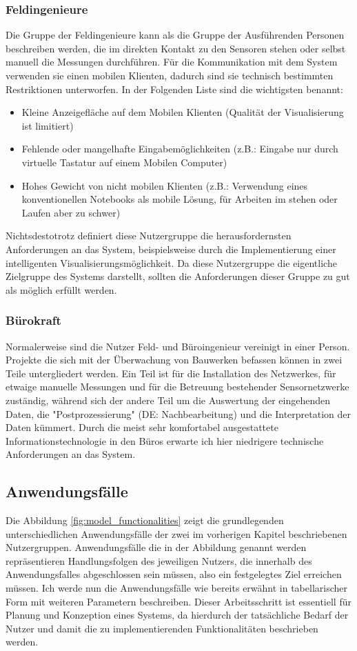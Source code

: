 \subsubsection{Feldingenieure}
Die Gruppe der Feldingenieure kann als die Gruppe der Ausführenden Personen beschreiben werden, die im direkten Kontakt zu den Sensoren stehen oder selbst manuell die Messungen durchführen. Für die Kommunikation mit dem System verwenden sie einen mobilen Klienten, dadurch sind sie technisch bestimmten Restriktionen unterworfen. In der Folgenden Liste sind die wichtigsten benannt:
\begin{itemize}
\item Kleine Anzeigefläche auf dem Mobilen Klienten (Qualität der Visualisierung ist limitiert)
\item Fehlende oder mangelhafte Eingabemöglichkeiten (z.B.: Eingabe nur durch virtuelle Tastatur auf einem Mobilen Computer)
\item Hohes Gewicht von nicht mobilen Klienten (z.B.: Verwendung eines konventionellen Notebooks als mobile Lösung, für Arbeiten im stehen oder Laufen aber zu schwer)
\end{itemize}
Nichtsdestotrotz definiert diese Nutzergruppe die herausfordernsten Anforderungen an das System, beispielsweise durch die Implementierung einer intelligenten Visualisierungsmöglichkeit. Da diese Nutzergruppe die eigentliche Zielgruppe des Systems darstellt, sollten die Anforderungen dieser Gruppe zu gut als möglich erfüllt werden.

\subsubsection{Bürokraft}
Normalerweise sind die Nutzer Feld- und Büroingenieur vereinigt in einer Person. Projekte die sich mit der Überwachung von Bauwerken befassen können in zwei Teile untergliedert werden. Ein Teil ist für die Installation des Netzwerkes, für etwaige manuelle Messungen und für die Betreuung bestehender Sensornetzwerke zuständig, während sich der andere Teil um die Auswertung der eingehenden Daten, die "Postprozessierung" (DE: Nachbearbeitung) und die Interpretation der Daten kümmert. Durch die meist sehr komfortabel ausgestattete Informationstechnologie in den Büros erwarte ich hier niedrigere technische Anforderungen an das System.

\subsection{Anwendungsfälle}
Die Abbildung \ref{fig:model_functionalities} zeigt die grundlegenden unterschiedlichen Anwendungsfälle der zwei im vorherigen Kapitel beschriebenen Nutzergruppen. Anwendungsfälle die in der Abbildung genannt werden repräsentieren Handlungsfolgen des jeweiligen Nutzers, die innerhalb des Anwendungsfalles abgeschlossen sein müssen, also ein festgelegtes Ziel erreichen müssen. Ich werde nun die Anwendungsfälle wie bereits erwähnt in tabellarischer Form mit weiteren Parametern beschreiben. Dieser Arbeitsschritt ist essentiell für Planung und Konzeption eines Systems, da hierdurch der tatsächliche Bedarf der Nutzer und damit die zu implementierenden Funktionalitäten beschrieben werden.

